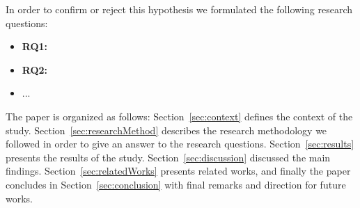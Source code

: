 In order to confirm or reject this hypothesis we formulated the following research questions:

\begin{itemize}
\item {\bf RQ1:}
\item {\bf RQ2:}
\item ...
\end{itemize}


The paper is organized as follows: Section~\ref{sec:context} defines the context of the study. Section~\ref{sec:researchMethod} describes the research methodology we followed in order to give an answer to the research questions. Section~\ref{sec:results} presents the results of the study. Section~\ref{sec:discussion} discussed the main findings. Section~\ref{sec:relatedWorks} presents related works, and finally the paper concludes in Section~\ref{sec:conclusion} with final remarks and direction for future works.
